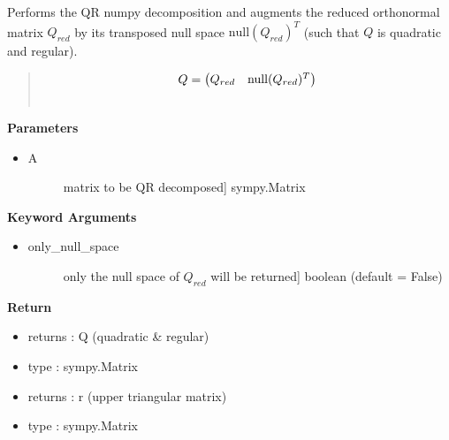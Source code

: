 \documentclass[letterpaper,10pt,english]{sphinxmanual}
\begin{document}
\begin{fulllineitems}
\label{pycontroltools:linearcontrol.robust_poleplacement.full_qr}
Performs the QR numpy decomposition and augments the reduced
orthonormal matrix $Q_{red}$ by its transposed null space
$\mathrm{null}(Q_{red})^T$
(such that $Q$ is quadratic and regular).
\begin{quote}
\begin{gather}
\begin{split}Q = \left(\begin{matrix} 
        Q_{red} &
        \mathrm{null}(Q_{red})^T
    \end{matrix}\right)\end{split}\notag\\\begin{split}\end{split}\notag
\end{gather}\end{quote}

\textbf{Parameters}
\begin{itemize}
\item {} \begin{description}
\item[{A}] \leavevmode{[}matrix to be QR decomposed{]}
sympy.Matrix

\end{description}

\end{itemize}

\textbf{Keyword Arguments}
\begin{itemize}
\item {} \begin{description}
\item[{only\_null\_space}] \leavevmode{[}only the null space of $Q_{red}$ will be returned{]}
boolean (default = False)

\end{description}

\end{itemize}

\textbf{Return}
\begin{itemize}
\item {} 
returns : Q (quadratic \& regular)

\item {} 
type : sympy.Matrix

\item {} 
returns : r (upper triangular matrix)

\item {} 
type : sympy.Matrix

\end{itemize}

\end{fulllineitems}
\end{document}

